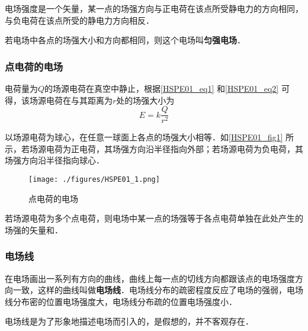 电场强度是一个矢量，某一点的场强方向与正电荷在该点所受静电力的方向相同，与负电荷在该点所受的静电力方向相反．

若电场中各点的场强大小和方向都相同，则这个电场叫\textbf{匀强电场}．

\subsubsection{点电荷的电场}

电荷量为$Q$的场源电荷在真空中静止，根据\autoref{HSPE01_eq1} 和\autoref{HSPE01_eq2} 可得，该场源电荷在与其距离为$r$处的场强大小为
\begin{equation}
E=k\frac{Q}{r^2}
\end{equation}

以场源电荷为球心，在任意一球面上各点的场强大小相等．如\autoref{HSPE01_fig1} 所示，若场源电荷为正电荷，其场强方向沿半径指向外部；若场源电荷为负电荷，其场强方向沿半径指向球心．

\begin{figure}[ht]
\centering
\texttt{[image: ./figures/HSPE01\_1.png]}
\caption{点电荷的电场} \label{HSPE01_fig1}
\end{figure}

若场源电荷为多个点电荷，则电场中某一点的场强等于各点电荷单独在此处产生的场强的矢量和．

\subsubsection{电场线}

在电场画出一系列有方向的曲线，曲线上每一点的切线方向都跟该点的电场强度方向一致，这样的曲线叫做\textbf{电场线}．电场线分布的疏密程度反应了电场的强弱，电场线分布密的位置电场强度大，电场线分布疏的位置电场强度小．

电场线是为了形象地描述电场而引入的，是假想的，并不客观存在．
